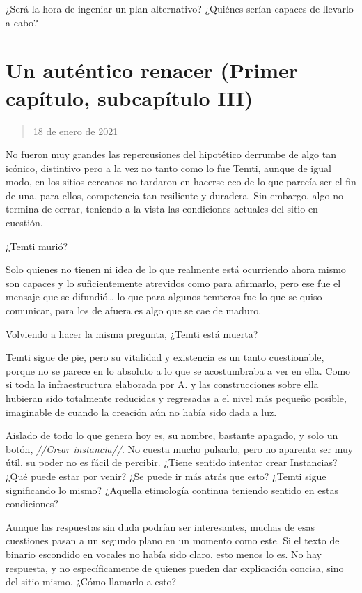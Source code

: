\documentclass[
  spanish,
]{book}
\begin{document}
¿Será la hora de ingeniar un plan alternativo? ¿Quiénes serían capaces de llevarlo a cabo?

\hypertarget{un-autuxe9ntico-renacer-primer-capuxedtulo-subcapuxedtulo-iii}{%
\section{Un auténtico renacer (Primer capítulo, subcapítulo III)}\label{un-autuxe9ntico-renacer-primer-capuxedtulo-subcapuxedtulo-iii}}

\begin{quote}
18 de enero de 2021
\end{quote}

No fueron muy grandes las repercusiones del hipotético derrumbe de algo tan icónico, distintivo pero a la vez no tanto como lo fue Temti, aunque de igual modo, en los sitios cercanos no tardaron en hacerse eco de lo que parecía ser el fin de una, para ellos, competencia tan resiliente y duradera. Sin embargo, algo no termina de cerrar, teniendo a la vista las condiciones actuales del sitio en cuestión.

¿Temti murió?

Solo quienes no tienen ni idea de lo que realmente está ocurriendo ahora mismo son capaces y lo suficientemente atrevidos como para afirmarlo, pero ese fue el mensaje que se difundió\ldots{} lo que para algunos temteros fue lo que se quiso comunicar, para los de afuera es algo que se cae de maduro.

Volviendo a hacer la misma pregunta, ¿Temti está muerta?

Temti sigue de pie, pero su vitalidad y existencia es un tanto cuestionable, porque no se parece en lo absoluto a lo que se acostumbraba a ver en ella. Como si toda la infraestructura elaborada por A. y las construcciones sobre ella hubieran sido totalmente reducidas y regresadas a el nivel más pequeño posible, imaginable de cuando la creación aún no había sido dada a luz.

Aislado de todo lo que genera hoy es, su nombre, bastante apagado, y solo un botón, \emph{//Crear instancia//}. No cuesta mucho pulsarlo, pero no aparenta ser muy útil, su poder no es fácil de percibir. ¿Tiene sentido intentar crear Instancias? ¿Qué puede estar por venir? ¿Se puede ir más atrás que esto? ¿Temti sigue significando lo mismo? ¿Aquella etimología continua teniendo sentido en estas condiciones?

Aunque las respuestas sin duda podrían ser interesantes, muchas de esas cuestiones pasan a un segundo plano en un momento como este. Si el texto de binario escondido en vocales no había sido claro, esto menos lo es. No hay respuesta, y no específicamente de quienes pueden dar explicación concisa, sino del sitio mismo. ¿Cómo llamarlo a esto?
\end{document}
